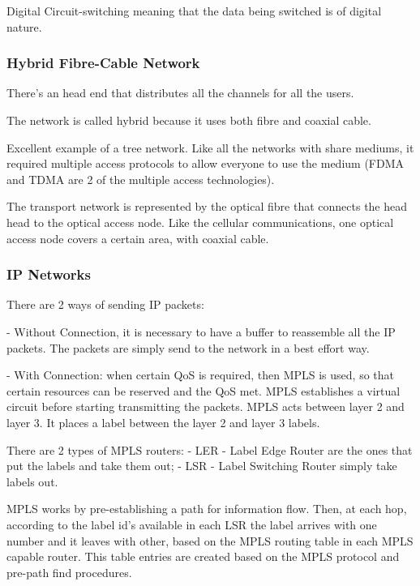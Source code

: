 Digital Circuit-switching meaning that the data being switched is of digital nature.



\subsubsection*{Hybrid Fibre-Cable Network}

There's an head end that distributes all the channels for all the users. 

The network is called hybrid because it uses both fibre and coaxial cable.


Excellent example of a tree network. Like all the networks with share mediums, it required multiple access protocols to allow everyone to use the medium (FDMA and TDMA are 2 of the multiple access technologies).



The transport network is represented by the optical fibre that connects the head head to the optical access node. Like the cellular communications, one optical access node covers a certain area, with coaxial cable.


\subsubsection*{IP Networks}

There are 2 ways of sending IP packets:

- Without Connection, it is necessary to have a buffer to reassemble all the IP packets. The packets are simply send to the network in a best effort way.

- With Connection: when certain QoS is required, then MPLS is used, so that certain resources can be reserved and the QoS met.
MPLS establishes a virtual circuit before starting transmitting the packets.
MPLS acts between layer 2 and layer 3. It places a label between the layer 2 and layer 3 labels.

There are 2 types of MPLS routers:
- LER - Label Edge Router are the ones that put the labels and take them out;
- LSR - Label Switching Router simply take labels out.

MPLS works by pre-establishing a path for information flow. Then, at each hop, according to the label id's available in each LSR the label arrives with one number and it leaves with other, based on the MPLS routing table in each MPLS capable router. This table entries are created based on the MPLS protocol and pre-path find procedures.


